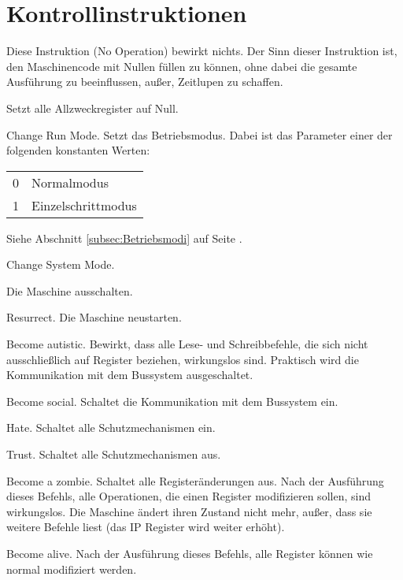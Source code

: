 \section{Kontrollinstruktionen}

Diese Instruktion (\glqq No Operation\grqq) bewirkt nichts.
Der Sinn dieser Instruktion ist, den Maschinencode mit Nullen füllen zu können,
ohne dabei die gesamte Ausführung zu beeinflussen, außer, Zeitlupen zu schaffen. 


Setzt alle Allzweckregister auf Null.


\glqq Change Run Mode\grqq.
Setzt das \gls{Betriebsmodus}.
Dabei ist das Parameter einer der folgenden konstanten Werten:
\begin{center}
  \begin{tabular}[l]{ll}
    0 & Normalmodus \\
    1 & Einzelschrittmodus \\
  \end{tabular}
\end{center}
Siehe Abschnitt \ref{subsec:Betriebsmodi} auf Seite
\pageref{subsec:Betriebsmodi}.



Change System Mode.



Die Maschine ausschalten.



\glqq Resurrect\grqq.
Die Maschine neustarten.



\glqq Become autistic\grqq.
Bewirkt, dass alle Lese- und Schreibbefehle, die sich nicht ausschließlich auf
Register beziehen, wirkungslos sind. Praktisch wird die Kommunikation mit dem
Bussystem ausgeschaltet.


\glqq Become social\grqq. Schaltet die Kommunikation mit dem Bussystem ein.


\glqq Hate\grqq. Schaltet alle Schutzmechanismen ein.


\glqq Trust\grqq. Schaltet alle Schutzmechanismen aus.


\glqq Become a zombie\grqq.
Schaltet alle Registeränderungen aus. Nach der Ausführung dieses Befehls, alle
Operationen, die einen Register modifizieren sollen, sind wirkungslos.
Die Maschine ändert ihren Zustand nicht mehr, außer, dass sie weitere Befehle
liest (das IP Register wird weiter erhöht).


\glqq Become alive\grqq.
Nach der Ausführung dieses Befehls, alle Register können wie normal modifiziert
werden.


